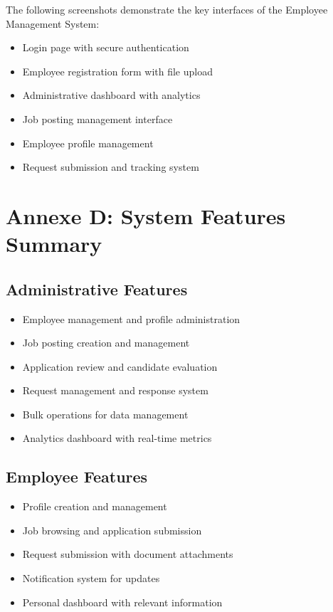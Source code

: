 \begin{center}
\noindent The following screenshots demonstrate the key interfaces of the Employee Management System:

\begin{itemize}
    \item Login page with secure authentication
    \item Employee registration form with file upload
    \item Administrative dashboard with analytics
    \item Job posting management interface
    \item Employee profile management
    \item Request submission and tracking system
\end{itemize}

\section{Annexe D: System Features Summary}
\label{sec:features-summary}

\subsection{Administrative Features}
\begin{itemize}
    \item Employee management and profile administration
    \item Job posting creation and management
    \item Application review and candidate evaluation
    \item Request management and response system
    \item Bulk operations for data management
    \item Analytics dashboard with real-time metrics
\end{itemize}

\subsection{Employee Features}
\begin{itemize}
    \item Profile creation and management
    \item Job browsing and application submission
    \item Request submission with document attachments
    \item Notification system for updates
    \item Personal dashboard with relevant information
\end{itemize}


\end{center}
